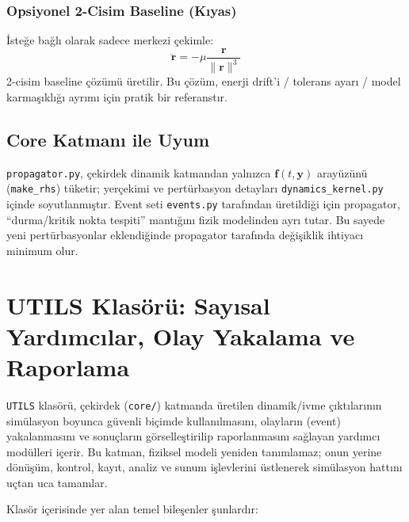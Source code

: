 \subsubsection*{Opsiyonel 2-Cisim Baseline (Kıyas)}
İsteğe bağlı olarak sadece merkezi çekimle:
\[
\ddot{\mathbf r}=-\mu\frac{\mathbf r}{\|\mathbf r\|^3}
\]
2-cisim baseline çözümü üretilir.
Bu çözüm, enerji drift’i / tolerans ayarı / model karmaşıklığı ayrımı için pratik bir referanstır.

\subsection*{Core Katmanı ile Uyum}
\texttt{propagator.py}, çekirdek dinamik katmandan yalnızca
\(\mathbf f(t,\mathbf y)\) arayüzünü (\texttt{make\_rhs}) tüketir;
yerçekimi ve pertürbasyon detayları \texttt{dynamics\_kernel.py} içinde soyutlanmıştır.
Event seti \texttt{events.py} tarafından üretildiği için propagator,
``durma/kritik nokta tespiti'' mantığını fizik modelinden ayrı tutar.
Bu sayede yeni pertürbasyonlar eklendiğinde propagator tarafında değişiklik ihtiyacı minimum olur.



\newpage
\section{UTILS Klasörü: Sayısal Yardımcılar, Olay Yakalama ve Raporlama}
\label{sec:utils_folder}

\texttt{UTILS} klasörü, çekirdek (\texttt{core/}) katmanda üretilen dinamik/ivme çıktılarının
simülasyon boyunca güvenli biçimde kullanılmasını, olayların (event) yakalanmasını ve sonuçların görselleştirilip raporlanmasını sağlayan yardımcı modülleri içerir. Bu katman, fiziksel modeli yeniden tanımlamaz; onun yerine dönüşüm, kontrol, kayıt, analiz ve sunum işlevlerini üstlenerek simülasyon hattını uçtan uca tamamlar.

Klasör içerisinde yer alan temel bileşenler şunlardır:

